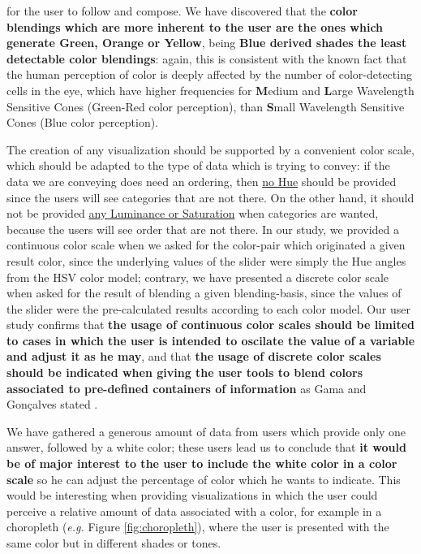 for the user to follow and compose. We have discovered that the \textbf{color blendings which are more inherent to the user are the ones which
generate Green, Orange or Yellow}, being \textbf{Blue derived shades the least detectable color blendings}: again, this is consistent with the known
fact that the human perception of color is deeply affected by the number of color-detecting cells in the eye, which have higher frequencies for
\textbf{M}edium and \textbf{L}arge Wavelength Sensitive Cones (Green-Red color perception), than \textbf{S}mall Wavelength Sensitive Cones
(Blue color perception). \par
%
The creation of any visualization should be supported by a convenient color scale, which should be adapted to the type of data which is trying to
convey: if the data we are conveying does need an ordering, then \ul{no Hue} should be provided since the users will see categories that are not there.
On the other hand, it should not be provided \ul{any Luminance or Saturation} when categories are wanted, because the users will see order that are not
there. In our study, we provided a continuous color scale when we asked for the color-pair which originated a given result color, since the underlying
values of the slider were simply the Hue angles from the HSV color model; contrary, we have presented a discrete color scale when asked for the result
of blending a given blending-basis, since the values of the slider were the pre-calculated results according to each color model. Our user study confirms
that \textbf{the usage of continuous color scales should be limited to cases in which the user is intended to oscilate the value of a variable and adjust
it as he may}, and that \textbf{the usage of discrete color scales should be indicated when giving the user tools to blend colors associated to
pre-defined containers of information} as Gama and Gonçalves stated \cite{Gama20142}.\par
%
We have gathered a generous amount of data from users which provide only one answer, followed by a white color; these users lead us to conclude that
\textbf{it would be of major interest to the user to include the white color in a color scale} so he can adjust the percentage of color which he wants
to indicate. This would be interesting when providing visualizations in which the user could perceive a relative amount of data associated with a color,
for example in a choropleth (\emph{e.g.} Figure \ref{fig:choropleth}), where the user is presented with the same color but in different shades or tones. \par
